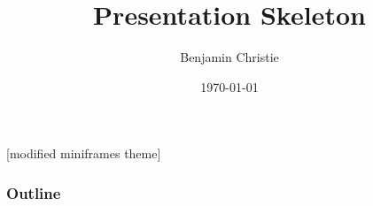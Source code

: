 \documentclass[10pt]{beamer}
\title{Presentation Skeleton}
\author{Benjamin Christie}
\date{\today}
\theoremstyle{definition}
\numberwithin{equation}{enumi}
\numberwithin{figure}{enumi}
\begin{document}
[modified miniframes theme]
\begin{frame}
	\titlepage
\end{frame}
\begin{frame}
	\frametitle{Outline}
	\tableofcontents
\end{frame}
\section{}
\begin{frame}
	\frametitle{}
\end{frame}
\end{document}
